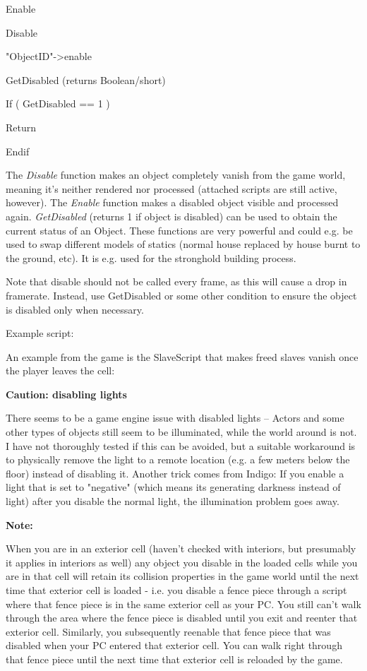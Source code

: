 \documentclass[
]{article}
\begin{document}
Enable

Disable

"ObjectID"-\textgreater enable

GetDisabled (returns Boolean/short)

If ( GetDisabled == 1 )

Return

Endif

The \emph{Disable} function makes an object completely vanish from the
game world, meaning it's neither rendered nor processed (attached
scripts are still active, however). The \emph{Enable} function makes a
disabled object visible and processed again. \emph{GetDisabled} (returns
1 if object is disabled) can be used to obtain the current status of an
Object. These functions are very powerful and could e.g. be used to swap
different models of statics (normal house replaced by house burnt to the
ground, etc). It is e.g. used for the stronghold building process.

Note that disable should not be called every frame, as this will cause a
drop in framerate. Instead, use GetDisabled or some other condition to
ensure the object is disabled only when necessary.

Example script:

An example from the game is the SlaveScript that makes freed slaves
vanish once the player leaves the cell:



\textbf{Caution: disabling lights}

There seems to be a game engine issue with disabled lights -- Actors and
some other types of objects still seem to be illuminated, while the
world around is not. I have not thoroughly tested if this can be
avoided, but a suitable workaround is to physically remove the light to
a remote location (e.g. a few meters below the floor) instead of
disabling it. Another trick comes from Indigo: If you enable a light
that is set to "negative" (which means its generating darkness instead
of light) after you disable the normal light, the illumination problem
goes away.

\textbf{Note:}

When you are in an exterior cell (haven't checked with interiors, but
presumably it applies in interiors as well) any object you disable in
the loaded cells while you are in that cell will retain its collision
properties in the game world until the next time that exterior cell is
loaded - i.e. you disable a fence piece through a script where that
fence piece is in the same exterior cell as your PC. You still can't
walk through the area where the fence piece is disabled until you exit
and reenter that exterior cell. Similarly, you subsequently reenable
that fence piece that was disabled when your PC entered that exterior
cell. You can walk right through that fence piece until the next time
that exterior cell is reloaded by the game.
\end{document}
